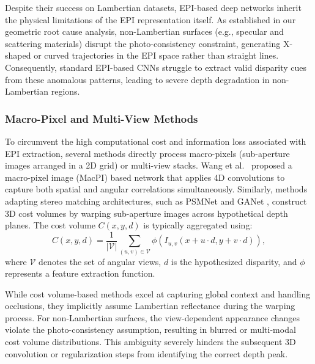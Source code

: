 \documentclass[lettersize,journal]{IEEEtran}
\begin{document}
Despite their success on Lambertian datasets, EPI-based deep networks inherit the physical limitations of the EPI representation itself. As established in our geometric root cause analysis, non-Lambertian surfaces (e.g., specular and scattering materials) disrupt the photo-consistency constraint, generating X-shaped or curved trajectories in the EPI space rather than straight lines. Consequently, standard EPI-based CNNs struggle to extract valid disparity cues from these anomalous patterns, leading to severe depth degradation in non-Lambertian regions.

\subsubsection{Macro-Pixel and Multi-View Methods}
To circumvent the high computational cost and information loss associated with EPI extraction, several methods directly process macro-pixels (sub-aperture images arranged in a 2D grid) or multi-view stacks. Wang et al.\ \cite{wang2018occlusion} proposed a macro-pixel image (MacPI) based network that applies 4D convolutions to capture both spatial and angular correlations simultaneously. Similarly, methods adapting stereo matching architectures, such as PSMNet \cite{chang2018pyramid} and GANet \cite{zhang2019ga}, construct 3D cost volumes by warping sub-aperture images across hypothetical depth planes. The cost volume $C(x, y, d)$ is typically aggregated using:
\begin{equation}
C(x, y, d) = \frac{1}{|\mathcal{V}|} \sum_{(u,v) \in \mathcal{V}} \phi(I_{u,v}(x + u \cdot d, y + v \cdot d)),
\label{eq:ch2_3}
\end{equation}
where $\mathcal{V}$ denotes the set of angular views, $d$ is the hypothesized disparity, and $\phi$ represents a feature extraction function.

While cost volume-based methods excel at capturing global context and handling occlusions, they implicitly assume Lambertian reflectance during the warping process. For non-Lambertian surfaces, the view-dependent appearance changes violate the photo-consistency assumption, resulting in blurred or multi-modal cost volume distributions. This ambiguity severely hinders the subsequent 3D convolution or regularization steps from identifying the correct depth peak.
\end{document}
